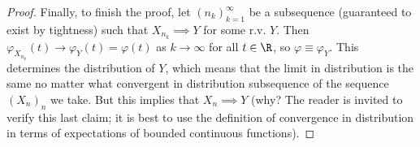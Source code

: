 \begin{proof}
Finally, to finish the proof, let $(n_k)_{k=1}^\infty$
be a subsequence (guaranteed to exist by tightness)
such that $X_{n_k}\implies Y$ for some r.v. $Y$. Then
$\varphi_{X_{n_k}}(t)\to \varphi_Y(t)=\varphi(t)$ as
$k\to\infty$ for all $t\in\R$, so
$\varphi\equiv\varphi_Y$. This determines the
distribution of $Y$, which means that the limit in
distribution is the same no matter what convergent in
distribution subsequence of the sequence $(X_n)_n$ we
take. But this implies that $X_n\implies Y$ (why? The
reader is invited to verify this last claim; it is
best to use the definition of convergence in
distribution in terms of expectations of bounded
continuous functions).
\end{proof}
